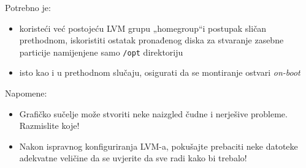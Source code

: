 \documentclass[12pt,a4paper]{article}
\begin{document}
Potrebno je:
\begin{itemize}
	\item koristeći već postojeću LVM grupu „homegroup“\footnotemark[3] i postupak sličan prethodnom, iskoristiti ostatak pronađenog diska za stvaranje zasebne particije namijenjene samo \texttt{/opt} direktoriju
	\item isto kao i u prethodnom slučaju, osigurati da se montiranje ostvari \textit{on-boot}\\
\end{itemize}

Napomene: 
\begin{itemize}
	\item Grafičko sučelje može stvoriti neke naizgled čudne i nerješive probleme. Razmislite koje!
	\item Nakon ispravnog konfiguriranja LVM-a, pokušajte prebaciti neke datoteke adekvatne veličine da se uvjerite da sve radi kako bi trebalo!
\end{itemize}




\end{document}
